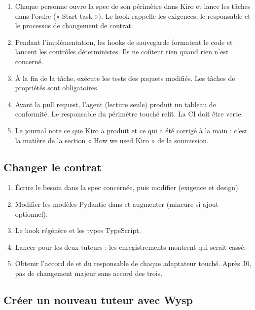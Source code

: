 \begin{enumerate}[leftmargin=1.2em]
  \item Chaque personne ouvre la spec de son périmètre dans Kiro et lance les tâches dans l'ordre (« Start task »). Le hook  rappelle les exigences, le responsable et le processus de changement de contrat.
  \item Pendant l'implémentation, les hooks de sauvegarde formatent le code et lancent les contrôles déterministes. Ils ne coûtent rien quand rien n'est concerné.
  \item À la fin de la tâche,  exécute les tests des paquets modifiés. Les tâches de propriétés sont obligatoires.
  \item Avant la pull request, l'agent  (lecture seule) produit un tableau de conformité. Le responsable du périmètre touché relit. La CI doit être verte.
  \item Le journal  note ce que Kiro a produit et ce qui a été corrigé à la main : c'est la matière de la section « How we used Kiro » de la soumission.
\end{enumerate}

\subsection{Changer le contrat}

\begin{enumerate}[leftmargin=1.2em]
  \item Écrire le besoin dans la spec concernée, puis modifier  (exigence et design).
  \item Modifier les modèles Pydantic dans  et augmenter  (mineure si ajout optionnel).
  \item Le hook  régénère  et les types TypeScript.
  \item Lancer  pour les deux tuteurs : les enregistrements montrent qui serait cassé.
  \item Obtenir l'accord de \PA{} et du responsable de chaque adaptateur touché. Après J0, pas de changement majeur sans accord des trois.
\end{enumerate}

\subsection{Créer un nouveau tuteur avec Wysp}

